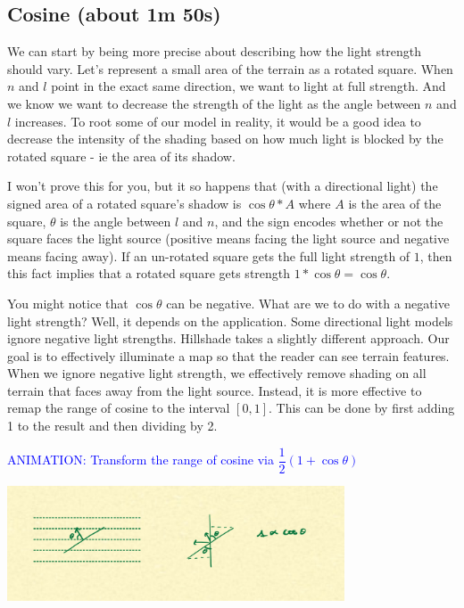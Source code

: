 \documentclass{article}
\newcommand\animation[1]{\textcolor{blue}{ANIMATION: #1}}
\begin{document}
\subsection{Cosine (about 1m 50s)}

We can start by being more precise about describing how the light strength should vary.
Let's represent a small area of the terrain as a rotated square.
When $n$ and $l$ point in the exact same direction, we want to light at full strength.
And we know we want to decrease the strength of the light as the angle between $n$ and $l$ increases.
To root some of our model in reality, it would be a good idea to decrease the intensity of the shading based on how much light is blocked by the rotated square - ie the area of its shadow.

I won't prove this for you, but it so happens that (with a directional light) the signed area of a rotated square's shadow is $\cos \theta * A$ where $A$ is the area of the square, $\theta$ is the angle between $l$ and $n$, and the sign encodes whether or not the square faces the light source (positive means facing the light source and negative means facing away).
If an un-rotated square gets the full light strength of $1$, then this fact implies that a rotated square gets strength $1 * \cos \theta = \cos \theta$.

You might notice that $\cos \theta$ can be negative.
What are we to do with a negative light strength?
Well, it depends on the application.
Some directional light models ignore negative light strengths.
Hillshade takes a slightly different approach.
Our goal is to effectively illuminate a map so that the reader can see terrain features.
When we ignore negative light strength, we effectively remove shading on all terrain that faces away from the light source.
Instead, it is more effective to remap the range of cosine to the interval $[0, 1]$.
This can be done by first adding 1 to the result and then dividing by 2.
 
\animation{Transform the range of cosine via $\dfrac{1}{2}(1 + \cos \theta)$}

\begin{center}
	\includegraphics[width=0.75\textwidth,frame]{assets/cosine.jpg}
\end{center}
\end{document}
